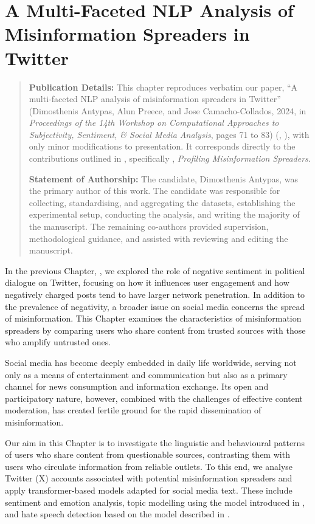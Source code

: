 \chapter{A Multi-Faceted NLP Analysis of Misinformation Spreaders in Twitter}
\label{ch:spreaders}


\begin{quote}
\textbf{Publication Details:} This chapter reproduces verbatim our paper, ``A multi-faceted NLP analysis of misinformation spreaders in Twitter'' (Dimosthenis Antypas, Alun Preece, and Jose Camacho-Collados, 2024, in \textit{Proceedings of the 14th Workshop on Computational Approaches to Subjectivity, Sentiment, \& Social Media Analysis}, pages 71 to 83) (, ), with only minor modifications to presentation. It corresponds directly to the contributions outlined in , specifically , \textit{Profiling Misinformation Spreaders}.

\textbf{Statement of Authorship:} The candidate, Dimosthenis Antypas, was the primary author of this work. The candidate was responsible for collecting, standardising, and aggregating the datasets, establishing the experimental setup, conducting the analysis, and writing the majority of the manuscript. The remaining co-authors provided supervision, methodological guidance, and assisted with reviewing and editing the manuscript.
\end{quote}

In the previous Chapter, , we explored the role of negative sentiment in political dialogue on Twitter, focusing on how it influences user engagement and how negatively charged posts tend to have larger network penetration. In addition to the prevalence of negativity, a broader issue on social media concerns the spread of misinformation. This Chapter examines the characteristics of misinformation spreaders by comparing users who share content from trusted sources with those who amplify untrusted ones.

Social media has become deeply embedded in daily life worldwide, serving not only as a means of entertainment and communication but also as a primary channel for news consumption and information exchange. Its open and participatory nature, however, combined with the challenges of effective content moderation, has created fertile ground for the rapid dissemination of misinformation.

Our aim in this Chapter is to investigate the linguistic and behavioural patterns of users who share content from questionable sources, contrasting them with users who circulate information from reliable outlets. To this end, we analyse Twitter (X) accounts associated with potential misinformation spreaders and apply transformer-based models adapted for social media text. These include sentiment and emotion analysis, topic modelling using the model introduced in , and hate speech detection based on the model described in .

